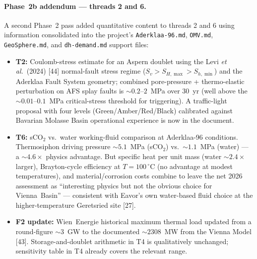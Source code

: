 \documentclass{article}
\begin{document}
\paragraph{Phase~2b addendum --- threads 2 and 6.} A second
Phase~2 pass added quantitative content to threads 2 and 6 using
information consolidated into the project's
\texttt{Aderklaa-96.md}, \texttt{OMV.md}, \texttt{GeoSphere.md},
and \texttt{dh-demand.md} support files:
\begin{itemize}
\item \textbf{T2:} Coulomb-stress estimate for an Aspern doublet using
the Levi \emph{et al.}\ (2024) [44] normal-fault stress regime
($S_v > S_{H,\max} > S_{h,\min}$) and the Aderklaa Fault System
geometry; combined pore-pressure + thermo-elastic perturbation on
AFS splay faults is $\sim 0.2$--$2$~MPa over 30~yr (well above the
$\sim 0.01$--$0.1$~MPa critical-stress threshold for triggering).
A traffic-light proposal with four levels (Green/Amber/Red/Black)
calibrated against Bavarian Molasse Basin operational experience is
now in the document.
\item \textbf{T6:} sCO$_2$ vs.\ water working-fluid comparison at
Aderklaa-96 conditions. Thermosiphon driving pressure $\sim 5.1$~MPa
(sCO$_2$) vs.\ $\sim 1.1$~MPa (water) --- a $\sim 4.6\times$ physics
advantage. But specific heat per unit mass (water $\sim 2.4\times$
larger), Brayton-cycle efficiency at $T = 100\,^\circ$C (no
advantage at modest temperatures), and material/corrosion costs
combine to leave the net 2026 assessment as ``interesting physics
but not the obvious choice for Vienna~Basin'' --- consistent with
Eavor's own water-based fluid choice at the higher-temperature
Geretsried site [27].
\item \textbf{F2 update:} Wien~Energie historical maximum thermal
load updated from a round-figure $\sim 3$~GW to the documented
$\sim 2308$~MW from the Vienna Model [43]. Storage-and-doublet
arithmetic in T4 is qualitatively unchanged; sensitivity table
in T4 already covers the relevant range.
\end{itemize}
\end{document}
